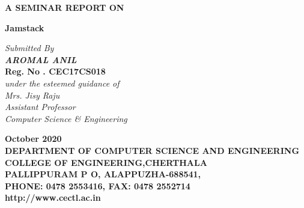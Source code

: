 \documentclass[12pt,a4paper,oneside]{report}
\begin{document}
\renewcommand\bibname{References}
\begin{titlepage}
\begin{center}
\Large{\textbf{A SEMINAR REPORT ON}}\\
\vspace{.2 in}
\begin{singlespace}
\LARGE{\textbf{Jamstack}}\\
\end{singlespace}
\vspace{.2 in}
\Large{\textit{Submitted By }}\\
\Large{\textit{\textbf{AROMAL ANIL}}} \\
\textbf{Reg. No . CEC17CS018}\\
\Large{\textit{\textit{under the esteemed guidance of}}}\\
\Large{\textit{Mrs. Jisy Raju}}\\
\Large{\textit{Assistant Professor}}\\
\Large{\textit{Computer Science \& Engineering}}
\vspace{.05in}
\begin{figure}[h]
\begin{center}
\end{center}
\end{figure}
\begin{singlespace}
\large{\textbf{October 2020}}\\
\vspace{.2in}
\large{\textbf{DEPARTMENT OF COMPUTER SCIENCE AND ENGINEERING\\COLLEGE OF ENGINEERING,CHERTHALA\\ PALLIPPURAM P O, ALAPPUZHA-688541, \\PHONE: 0478 2553416, FAX: 0478 2552714\\http://www.cectl.ac.in}}
\end{singlespace}
\end{center}
\end{titlepage}
\end{document}
